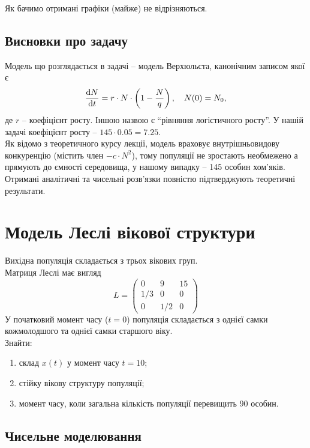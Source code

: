 Як бачимо отримані графіки (майже) не відрізняються.

\subsection{Висновки про задачу}

Модель що розглядається в задачі -- модель Верхюльста, канонічним записом якої є 
\begin{equation*}
    \frac{\mathop{}\!\mathrm{d} N}{\mathop{}\!\mathrm{d} t} = r \cdot N \cdot \left( 1 - \frac{N}{q} \right), \quad N(0) = N_0,
\end{equation*}
де $r$ -- коефіцієнт росту. Іншою назвою є ``рівняння логістичного росту''. У нашій задачі коефіцієнт росту -- $145 \cdot 0.05 = 7.25$. \\

Як відомо з теоретичного курсу лекції, модель враховує внутрішньовидову конкуренцію (містить член $-c \cdot N^2$), тому популяції не зростають необмежено а прямують до ємності середовища, у нашому випадку -- 145 особин хом'яків. \\

Отримані аналітичні та чисельні розв'язки повністю підтверджують теоретичні результати.

\section{Модель Леслі вікової структури}

Вихідна популяція складається з трьох вікових груп. \\

Матриця Леслі має вигляд \[ L = \begin{pmatrix} 0 & 9 & 15 \\ 1/3 & 0 & 0 \\ 0 & 1/2 & 0 \end{pmatrix} \] У початковий момент часу ($t = 0$) популяція складається з однієї самки кожмолодшого та однієї самки старшого віку. \\

Знайти:
\begin{enumerate}
	\item склад $x(t)$ у момент часу $t = 10$;
	\item стійку вікову структуру популяції;
	\item момент часу, коли загальна кількість популяції перевищить 90 особин.
\end{enumerate}

\subsection{Чисельне моделювання}

